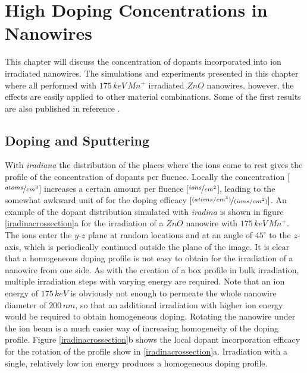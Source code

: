 \chapter{High Doping Concentrations in Nanowires}
\label{sec:high}

This chapter will discuss the concentration of dopants incorporated into ion irradiated nanowires. The simulations and experiments presented in this chapter where all performed with $175\, keV\,Mn^+$ irradiated $ZnO$ nanowires, however, the effects are easily applied to other material combinations. Some of the first results are also published in reference \cite{johannes_enhanced_2014}.

\section{Doping and Sputtering}

With \emph{iradiana} the distribution of the places where the ions come to rest gives the profile of the concentration of dopants per fluence. Locally the concentration [$\nicefrac{atoms}{cm^{3}}$] increases a certain amount per fluence [$\nicefrac{ions}{cm^{2}}$], leading to the somewhat awkward unit of for the doping efficacy $[\nicefrac{(atoms/cm^{3})}{(ions/cm^{2})}]$. An example of the dopant distribution simulated with \emph{iradina} is shown in figure \ref{iradinacrossection}a for the irradiation of a $ZnO$ nanowire with $175\,keV\,Mn^+$. The ions enter the $y$-$z$ plane at random locations and at an angle of $45^\circ$ to the $z$-axis, which is periodically continued outside the plane of the image. It is clear that a homogeneous doping profile is not easy to obtain for the irradiation of a nanowire from one side. As with the creation of a box profile in bulk irradiation, multiple irradiation steps with varying energy are required. Note that an ion energy of $175\,keV$ is obviously not enough to permeate the whole nanowire diameter of $200\,nm$, so that an additional irradiation with higher ion energy would be required to obtain homogeneous doping. Rotating the nanowire under the ion beam is a much easier way of increasing homogeneity of the doping profile. Figure \ref{iradinacrossection}b shows the local dopant incorporation efficacy for the rotation of the profile show in \ref{iradinacrossection}a. Irradiation with a single, relatively low ion energy produces a homogeneous doping profile. 
  
